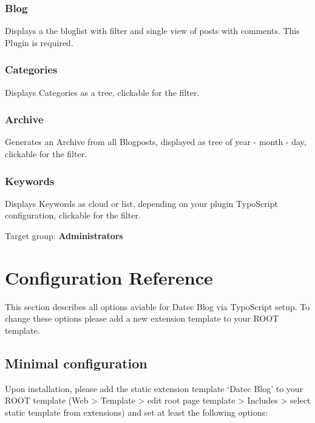 \documentclass[a4paper,10pt,english]{sphinxmanual}
\begin{document}
\subsection{Blog}
\label{AdministratorManual/Index:blog}
Displays a the bloglist with filter and single view of posts with comments. This Plugin is required.


\subsection{Categories}
\label{AdministratorManual/Index:categories}
Displays Categories as a tree, clickable for the filter.


\subsection{Archive}
\label{AdministratorManual/Index:archive}
Generates an Archive from all Blogposts, displayed as tree of year - month - day, clickable for the filter.


\subsection{Keywords}
\label{AdministratorManual/Index:keywords}
Displays Keywords as cloud or list, depending on your plugin TypoScript configuration, clickable for the filter.

Target group: \textbf{Administrators}


\chapter{Configuration Reference}
\label{Configuration/Index:configuration}\label{Configuration/Index:configuration-reference}\label{Configuration/Index::doc}
This section describes all options aviable for Datec Blog via TypoScript setup. To change these options please add a new extension template to your ROOT template.


\section{Minimal configuration}
\label{Configuration/Index:configuration-typoscript}\label{Configuration/Index:minimal-configuration}
Upon installation, please add the static extension template `Datec Blog' to your ROOT template (Web \textgreater{} Template \textgreater{} edit root page template \textgreater{} Includes \textgreater{} select static template from extensions) and set at least the following options:
\end{document}
